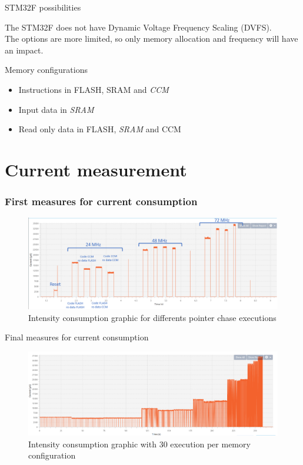 \documentclass[
	11pt, %
]{beamer}
\begin{document}
\begin{frame}{STM32F possibilities}

\begin{block}{}
	The STM32F does not have Dynamic Voltage Frequency Scaling (DVFS).\\
	The options are more limited, so only memory allocation and frequency will have an impact.
\end{block}
\begin{block}{Memory configurations }
	\begin{itemize}
		\item Instructions in FLASH, SRAM and \emph{CCM}
		\item Input data in \emph{SRAM}
		\item Read only data in FLASH, \emph{SRAM} and CCM
	\end{itemize}
\end{block}
	
\end{frame}


\section{Current measurement} %
\begin{frame}
	\frametitle{First measures for current consumption}
	\begin{figure}
		\centering
        \includegraphics[scale=0.6]{images/pointer_chase_capture_mod.png}
        \caption{Intensity consumption graphic for differents pointer chase executions}
	\end{figure}
\end{frame}

\begin{frame}{Final measures for current consumption}
	\begin{figure}
		\centering
        \includegraphics[scale=0.4]{images/pointer_chase30ex.png}
        \caption{Intensity consumption graphic with 30 execution per memory configuration}
	\end{figure}
\end{frame}
\end{document}
